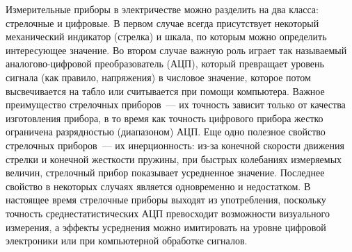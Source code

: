 Измерительные приборы в электричестве можно разделить на два класса: стрелочные и цифровые. В первом случае всегда присутствует некоторый механический индикатор (стрелка) и шкала, по которым можно определить интересующее значение. Во втором случае важную роль играет так называемый аналогово-цифровой преобразователь (АЦП), который превращает уровень сигнала (как правило, напряжения) в числовое значение, которое потом высвечивается на табло или считывается при помощи компьютера. Важное преимущество стрелочных приборов~--- их точность зависит только от качества изготовления прибора, в то время как точность цифрового прибора жестко ограничена разрядностью (диапазоном) АЦП. Еще одно полезное свойство стрелочных приборов~--- их инерционность: из-за конечной скорости движения стрелки и конечной жесткости пружины, при быстрых колебаниях измеряемых величин, стрелочный прибор показывает усредненное значение. Последнее свойство в некоторых случаях является одновременно и недостатком. В настоящее время стрелочные приборы выходят из употребления, поскольку точность среднестатистических АЦП превосходит возможности визуального измерения, а эффекты усреднения можно имитировать на уровне цифровой электроники или при компьютерной обработке сигналов.